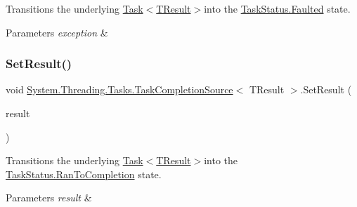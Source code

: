 Transitions the underlying \hyperlink{class_system_1_1_threading_1_1_tasks_1_1_task}{Task$<$\+T\+Result$>$}into the \hyperlink{namespace_system_1_1_threading_1_1_tasks_a60ab70a6c84627853d6b1056f1edebcfa2b310d05c23325e2935ec87b25a60b8f}{Task\+Status.\+Faulted} state. 


\begin{DoxyParams}{Parameters}
{\em exception} & \\
\hline
\end{DoxyParams}
\mbox{\label{class_system_1_1_threading_1_1_tasks_1_1_task_completion_source_a36ab907315892a8b35ac4372c3f408c4}} 
\subsubsection{\texorpdfstring{Set\+Result()}{SetResult()}}
{\footnotesize\ttfamily void \hyperlink{class_system_1_1_threading_1_1_tasks_1_1_task_completion_source}{System.\+Threading.\+Tasks.\+Task\+Completion\+Source}$<$ T\+Result $>$.Set\+Result (\begin{DoxyParamCaption}\item[{T\+Result}]{result }\end{DoxyParamCaption})\hspace{0.3cm}{\ttfamily [inline]}}



Transitions the underlying \hyperlink{class_system_1_1_threading_1_1_tasks_1_1_task}{Task$<$\+T\+Result$>$}into the \hyperlink{namespace_system_1_1_threading_1_1_tasks_a60ab70a6c84627853d6b1056f1edebcfaafe3c20f08a3dd6c4cab23d979c8f1e9}{Task\+Status.\+Ran\+To\+Completion} state. 


\begin{DoxyParams}{Parameters}
{\em result} & \\
\hline
\end{DoxyParams}
\mbox{\label{class_system_1_1_threading_1_1_tasks_1_1_task_completion_source_a892fea1287343b8905bbe8b4fa0407af}} 
